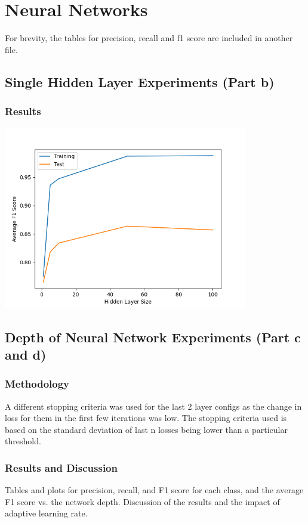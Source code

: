 \documentclass[12pt]{article}
\begin{document}
\section{Neural Networks}

For brevity, the tables for precision, recall and f1 score are included in another file.

\subsection{Single Hidden Layer Experiments (Part b)}

\subsubsection{Results}


\begin{center}
    \includegraphics[width=0.8\textwidth]{Assignment 3/q2/(b) f1 vs hidden_size.png}
\end{center}



\subsection{Depth of Neural Network Experiments (Part c and d)}
\subsubsection{Methodology}
A different stopping criteria was used for the last 2 layer configs as the change in loss for them in the first few iterations was low. The stopping criteria used is based on the standard deviation of last n losses being lower than a particular threshold.

\subsubsection{Results and Discussion}
Tables and plots for precision, recall, and F1 score for each class, and the average F1 score vs. the network depth. Discussion of the results and the impact of adaptive learning rate.
\end{document}
